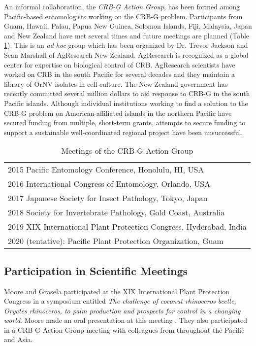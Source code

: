 \documentclass[12pt,
letterpaper,english,bibliography=totocnumbered, abstract=on]{scrartcl}
\begin{document}
An informal collaboration, the \textit{CRB-G Action Group}, has been formed among Pacific-based entomologists working on the CRB-G problem. Participants from Guam, Hawaii, Palau, Papua New Guinea, Solomon Islands, Fiji, Malaysia, Japan and New Zealand have met several times and future meetings are planned (Table \ref{tab:action-group}).  This is an \textit{ad hoc} group which has been organized by Dr. Trevor Jackson and Sean Marshall of AgResearch New Zealand. AgResearch is recognized as a global center for expertise on biological control of CRB. AgResearch scientists have worked on CRB in the south Pacific for several decades and they maintain a library of OrNV isolates in cell culture. The New Zealand government has recently committed several million dollars to aid response to CRB-G in the south Pacific islands. Although individual institutions working to find a solution to the CRB-G problem on American-affiliated islands in the northern Pacific have secured funding from multiple, short-term grants, attempts to secure funding to support a sustainable well-coordinated regional project have been unsuccessful. 

\begin{table}[h]
	\centering
	\caption{Meetings of the CRB-G Action Group}
	\begin{tabular}{l}
		\toprule
		2015 Pacific Entomology Conference, Honolulu, HI, USA \\
		2016 International Congress of Entomology, Orlando, USA \\
		2017 Japanese Society for Insect Pathology, Tokyo, Japan \\
		2018 Society for Invertebrate Pathology, Gold Coast, Australia \\
		2019 XIX International Plant Protection Congress, Hyderabad, India \\
		2020 (tentative): Pacific Plant Protection Organization, Guam \\
		\bottomrule
	\end{tabular}
	\label{tab:action-group}
\end{table}	

\subsection{Participation in Scientific Meetings}

Moore and Grasela participated at the XIX International Plant Protection Congress in a symposium entitled \textit{The challenge of coconut rhinoceros beetle, Oryctes rhinoceros, to palm production and prospects for control in a changing world}. Moore made an oral presentation at this meeting \parencite{moore_status_2019}.
They also participated in a CRB-G Action Group meeting with colleagues from throughout the Pacific and Asia.
\end{document}
